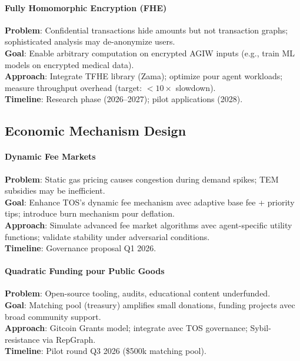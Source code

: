 \documentclass[11pt]{article}
\begin{document}
\paragraph{Fully Homomorphic Encryption (FHE)}
\textbf{Problem}: Confidential transactions hide amounts but not transaction graphs; sophisticated analysis may de-anonymize users.\\
\textbf{Goal}: Enable arbitrary computation on encrypted AGIW inputs (e.g., train ML models on encrypted medical data).\\
\textbf{Approach}: Integrate TFHE library (Zama); optimize pour agent workloads; measure throughput overhead (target: $<10\times$ slowdown).\\
\textbf{Timeline}: Research phase (2026--2027); pilot applications (2028).

\subsection{Economic Mechanism Design}

\paragraph{Dynamic Fee Markets}
\textbf{Problem}: Static gas pricing causes congestion during demand spikes; TEM subsidies may be inefficient.\\
\textbf{Goal}: Enhance TOS's dynamic fee mechanism avec adaptive base fee + priority tips; introduce burn mechanism pour deflation.\\
\textbf{Approach}: Simulate advanced fee market algorithms avec agent-specific utility functions; validate stability under adversarial conditions.\\
\textbf{Timeline}: Governance proposal Q1 2026.

\paragraph{Quadratic Funding pour Public Goods}
\textbf{Problem}: Open-source tooling, audits, educational content underfunded.\\
\textbf{Goal}: Matching pool (treasury) amplifies small donations, funding projects avec broad community support.\\
\textbf{Approach}: Gitcoin Grants model; integrate avec TOS governance; Sybil-resistance via RepGraph.\\
\textbf{Timeline}: Pilot round Q3 2026 (\$500k matching pool).
\end{document}
